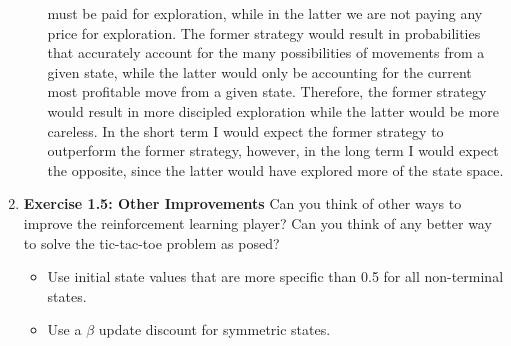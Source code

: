 \documentclass[12pt]{article}
\begin{document}
\begin{enumerate}[label=(\alph*)]
\begin{itemize}
    must be paid for exploration, while in the latter we are not paying any price for exploration. The former strategy
    would result in probabilities that accurately account for the many possibilities of movements from a given state,
    while the latter would only be accounting for the current most profitable move from a given state. Therefore, the 
    former strategy would result in more discipled exploration while the latter would be more careless. In the short term
    I would expect the former strategy to outperform the former strategy, however, in the long term I would expect the
    opposite, since the latter would have explored more of the state space.
  \end{itemize}
  \item \textbf{Exercise 1.5: Other Improvements} Can you think of other ways to improve the reinforcement learning player?
  Can you think of any better way to solve the tic-tac-toe problem as posed?
  \begin{itemize}
    \item Use initial state values that are more specific than 0.5 for all non-terminal states.
    \item Use a $\beta$ update discount for symmetric states.
  \end{itemize}
\end{enumerate}
\end{document}
